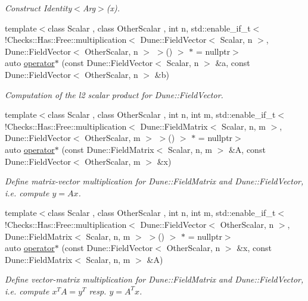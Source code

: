 \begin{DoxyCompactItemize}
\begin{DoxyCompactList}\small\item\em Construct Identity$<$\+Arg$>$(x). \end{DoxyCompactList}\item 
{\footnotesize template$<$class Scalar , class Other\+Scalar , int n, std\+::enable\+\_\+if\+\_\+t$<$ !\+Checks\+::\+Has\+::\+Free\+::multiplication$<$ Dune\+::\+Field\+Vector$<$ Scalar, n $>$, Dune\+::\+Field\+Vector$<$ Other\+Scalar, n $>$ $>$() $>$ $\ast$  = nullptr$>$ }\\auto \hyperlink{namespaceFunG_a5e258023361844926f485229c62a733b}{operator$\ast$} (const Dune\+::\+Field\+Vector$<$ Scalar, n $>$ \&a, const Dune\+::\+Field\+Vector$<$ Other\+Scalar, n $>$ \&b)
\begin{DoxyCompactList}\small\item\em Computation of the l2 scalar product for Dune\+::\+Field\+Vector. \end{DoxyCompactList}\item 
{\footnotesize template$<$class Scalar , class Other\+Scalar , int n, int m, std\+::enable\+\_\+if\+\_\+t$<$ !\+Checks\+::\+Has\+::\+Free\+::multiplication$<$ Dune\+::\+Field\+Matrix$<$ Scalar, n, m $>$, Dune\+::\+Field\+Vector$<$ Other\+Scalar, m $>$ $>$() $>$ $\ast$  = nullptr$>$ }\\auto \hyperlink{namespaceFunG_abadb8da34a5abc3dde0107231ab91c6f}{operator$\ast$} (const Dune\+::\+Field\+Matrix$<$ Scalar, n, m $>$ \&A, const Dune\+::\+Field\+Vector$<$ Other\+Scalar, m $>$ \&x)
\begin{DoxyCompactList}\small\item\em Define matrix-\/vector multiplication for Dune\+::\+Field\+Matrix and Dune\+::\+Field\+Vector, i.\+e. compute $y=Ax$. \end{DoxyCompactList}\item 
{\footnotesize template$<$class Scalar , class Other\+Scalar , int n, int m, std\+::enable\+\_\+if\+\_\+t$<$ !\+Checks\+::\+Has\+::\+Free\+::multiplication$<$ Dune\+::\+Field\+Vector$<$ Other\+Scalar, n $>$, Dune\+::\+Field\+Matrix$<$ Scalar, n, m $>$ $>$() $>$ $\ast$  = nullptr$>$ }\\auto \hyperlink{namespaceFunG_a19a9d7b55b56f5101560034413a1dbfe}{operator$\ast$} (const Dune\+::\+Field\+Vector$<$ Other\+Scalar, n $>$ \&x, const Dune\+::\+Field\+Matrix$<$ Scalar, n, m $>$ \&A)
\begin{DoxyCompactList}\small\item\em Define vector-\/matrix multiplication for Dune\+::\+Field\+Matrix and Dune\+::\+Field\+Vector, i.\+e. compute $x^T A = y^T$ resp. $y=A^T x$. \end{DoxyCompactList}\item 

\end{DoxyCompactItemize}
